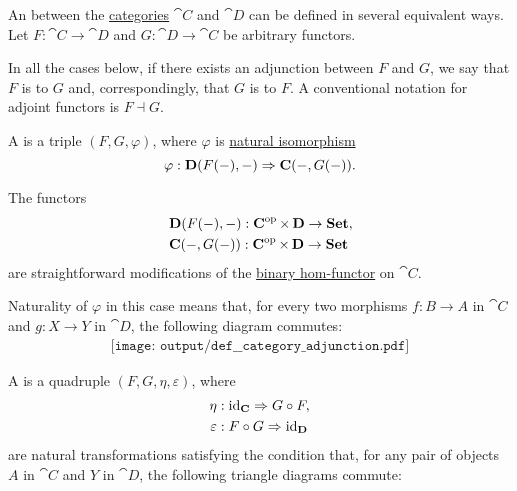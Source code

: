 \begin{definition}\label{def:category_adjunction}
  An  between the \hyperref[def:category]{categories} \( \cat{C} \) and \( \cat{D} \) can be defined in several equivalent ways. Let \( F: \cat{C} \to \cat{D} \) and \( G: \cat{D} \to \cat{C} \) be arbitrary functors.

  In all the cases below, if there exists an adjunction between \( F \) and \( G \), we say that \( F \) is  to \( G \) and, correspondingly, that \( G \) is  to \( F \). A conventional notation for adjoint functors is \( F \dashv G \).

  \begin{thmenum}
     A  is a triple \( (F, G, \varphi) \), where \( \varphi \) is \hyperref[thm:natural_isomorphism]{natural isomorphism}
    \begin{equation}\label{eq:def:category_adjunction/hom}
      \varphi: \cat{D}(F(\anon*), \anon*) \Rightarrow \cat{C}(\anon*, G(\anon*)).
    \end{equation}

    The functors
    \begin{align*}
      &\cat{D}(F(\anon*), \anon*): \cat{C}^{\opcat} \times \cat{D} \to \cat{Set}, \\
      &\cat{C}(\anon*, G(\anon*)): \cat{C}^{\opcat} \times \cat{D} \to \cat{Set}
    \end{align*}
    are straightforward modifications of the \hyperref[eq:def:hom_functor/binary]{binary hom-functor} on \( \cat{C} \).

    Naturality of \( \varphi \) in this case means that, for every two morphisms \( f: B \to A \) in \( \cat{C} \) and \( g: X \to Y \) in \( \cat{D} \), the following diagram commutes:
    \begin{equation}\label{eq:def:category_adjunction/varphi_nat}
      \begin{aligned}
        \texttt{[image: output/def\_\_category\_adjunction.pdf]}
      \end{aligned}
    \end{equation}

     A  is a quadruple \( (F, G, \eta, \varepsilon) \), where
    \begin{equation}\label{eq:def:category_adjunction/unit_counit/signature}
      \begin{aligned}
               \eta &: \id_{\cat{C}} \Rightarrow G \bincirc F, \\
        \varepsilon &: F \bincirc G \Rightarrow \id_{\cat{D}}
      \end{aligned}
    \end{equation}
    are natural transformations satisfying the condition that, for any pair of objects \( A \) in \( \cat{C} \) and \( Y \) in \( \cat{D} \), the following triangle diagrams commute:


\end{thmenum}
\end{definition}
